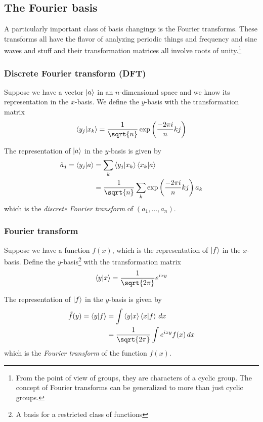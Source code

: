 \documentclass[12pt, oneside, letterpaper, fleqn]{article}
\begin{document}
\subsection{The Fourier basis}
A particularly important class of basis changings is the Fourier
transforms. These transforms all have the flavor of analyzing periodic
things and frequency and sine waves and stuff and their transformation
matrices all involve roots of unity.\footnote{From the point of view of
groups, they are characters of a cyclic group. The concept of Fourier
transforms can be generalized to more than just cyclic groups.}

\subsubsection{Discrete Fourier transform (DFT)}
Suppose we have a vector $\left\lvert a\right\rangle$ in an $n$-dimensional space and we
know its representation in the $x$-basis. We define the $y$-basis with
the transformation matrix
\begin{align}
\braket{y_j}{x_k} = \frac{1}{\sqrt{n}}\exp\left(\frac{-2\pi i}{n}
kj\right)
\end{align}

The representation of $\left\lvert a\right\rangle$ in the $y$-basis is given by
\begin{align}
\tilde{a}_j = \braket{y_j}{a} &= \sum_k
\braket{y_j}{x_k}\braket{x_k}{a}\nonumber\\
&= \frac{1}{\sqrt{n}} \sum_k \exp\left(\frac{-2\pi i}{n} kj\right) a_k
\end{align}
which is the \emph{discrete Fourier transform} of $(a_1,\dotsc,
a_n)$.

\subsubsection{Fourier transform}
Suppose we have a function $f(x)$, which is the representation of
$\left\lvert f\right\rangle$ in the $x$-basis. Define the $y$-basis\footnote{A basis for a
restricted class of functions} with the transformation matrix
\begin{align}
\braket{y}{x} = \frac{1}{\sqrt{2\pi}} e^{ixy}
\end{align}

The representation of $\left\lvert f\right\rangle$ in the $y$-basis is given by
\begin{align}
\tilde{f}(y) = \braket{y}{f} &= \int
\braket{y}{x}\braket{x}{f}\,dx\nonumber\\
&= \frac{1}{\sqrt{2\pi}} \int e^{ixy} f(x)\,dx
\end{align}
which is the \emph{Fourier transform} of the function $f(x)$.
\end{document}
